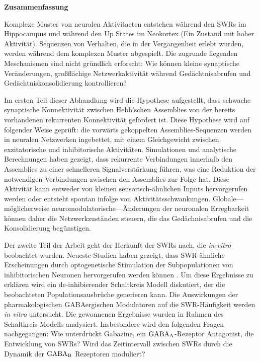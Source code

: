 \huge\textbf{Zusammenfassung}
\normalsize
\vspace{10mm}

Komplexe Muster von neuralen Aktivitaeten entstehen w\"{a}hrend den SWRs im
Hippocampus und w\"{a}hrend den Up States im Neokortex (Ein Zustand mit hoher
Aktivit\"{a}t). Sequenzen von Verhalten, die in der Vergangenheit erlebt
wurden, werden w\"{a}hrend dem komplexen Muster abgespielt.  Die zugrunde
liegenden Meschanismen sind nicht gründlich erforscht: Wie k\"{o}nnen kleine
synaptische Ver\"{a}nderungen, gro{\ss}fl\"{a}chige Netzwerkaktivit\"{a}t
w\"{a}hrend Ged\"{a}chtnisabrufen und Ged\"{a}chtniskonsolidierung
kontrollieren?

Im ersten Teil dieser Abhandlung wird die Hypothese aufgestellt, dass schwache
synaptische Konnektivit\"{a}t zwischen Hebb'schen Assemblies von der bereits
vorhandenen rekurrenten Konnektivität  gef\"{o}rdert ist. Diese Hypothese wird
auf folgender Weise gepr\"{u}ft: die vorw\"{a}rts gekoppelten
Assemblies-Sequenzen werden in neuralen Netzwerken ingebettet, mit einem
Gleichgewicht zwischen exzitatorische und inhibitorische Aktivit\"{a}ten.
Simulationen und analytische Berechnungen haben gezeigt, dass rekurrente
Verbindungen innerhalb den Assemblies zu einer schnelleren
Signalverst\"{a}rkung f\"{u}hren, was eine Reduktion der notwendigen
Verbindungen zwischen den Assemblies zur Folge hat. Diese Aktivit\"{a}t kann
entweder von kleinen sensorisch-\"{a}hnlichen Inputs hervorgerufen werden oder
entsteht spontan infolge von Aktivit\"{a}tsschwankungen.
Globale---m\"{o}glicherweise neuromodulatorische---\"{A}nderungen der
neuronalen Erregbarkeit k\"{o}nnen daher die Netzwerkzust\"{a}nden steuern, die
das Gedächnisabrufen und die Konsolidierung beg\"{u}nstigen.


Der zweite Teil der Arbeit geht der Herkunft der SWRs nach, die
\textit{in-vitro} beobachtet wurden. Neueste Studien haben gezeigt, dass
SWR-\"{a}hnliche Erscheinungen durch optogenetische Stimulation der
Subpopulationen von inhibitorischen Neuronen hervorgerufen werden k\"{o}nnen
\citep{Schlingloff2014, Kohus2016}. Um diese Ergebnisse zu erkl\"{a}ren wird
ein de-inhibierender Schaltkreis Modell diskutiert, der die beobachteten
Populationsausbr\"{u}che generieren kann. Die Auswirkungen der
pharmakologischen GABAergischen Modulatoren auf die SWR-H\"{a}ufigkeit werden
\textit{in vitro} untersucht. Die gewonnenen Ergebnisse wurden in Rahmen des
Schaltkreis Modells analysiert.  Insbesondere wird den folgenden Fragen
nachgegangen: Wie unterdr\"{u}ckt Gabazine, ein $\rm GABA_A$-Rezeptor
Antagonist, die Entwicklung von SWRs? Wird das Zeitintervall zwischen SWRs
durch die Dynamik der $\rm GABA_B$ Rezeptoren moduliert?

\newpage
